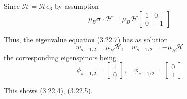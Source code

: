 \documentclass{article}
\begin{document}
Since $\mathcal{H}=\mathcal{H} e_{3}$ by assumption
$$
\mu_{B} \boldsymbol{\sigma} \cdot \boldsymbol{\mathcal { H }}=\mu_{B} \mathcal{H}\left[\begin{array}{rr}
1 & 0  \tag{3.22.10}\\
0 & -1
\end{array}\right]
$$

Thus, the eigenvalue equation (3.22.7) has as solution
$$
\begin{equation*}
w_{s+1 / 2}=\mu_{B} \mathcal{H}, \quad w_{s-1 / 2}=-\mu_{B} \mathcal{H} \tag{3.22.11}
\end{equation*}
$$
the corresponding eigenspinors being
$$
\phi_{s+1 / 2}=\left[\begin{array}{l}
1  \tag{3.22.12}\\
0
\end{array}\right], \quad \phi_{s-1 / 2}=\left[\begin{array}{l}
0 \\
1
\end{array}\right]
$$

This shows (3.22.4), (3.22.5).
\end{document}

